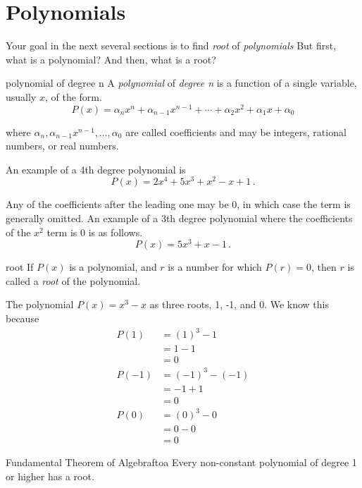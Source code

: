 \section{Polynomials}
\label{sec.general}

Your goal in the next several sections is to find \emph{root} of \emph{polynomials}
But first, what is a polynomial? And then, what is a root?

\begin{definition}{polynomial of degree n}{}
  A \emph{polynomial} of \emph{degree n} is a function of a single variable, usually $x$,
  of the form.
  \[P(x) = \alpha_n x^n + \alpha_{n-1} x^{n-1} + \cdots + \alpha_2 x^2 + \alpha_1 x + \alpha_0 \]

  where $\alpha_n,  \alpha_{n-1} x^{n-1}, \ldots, \alpha_0$ are called coefficients and may be integers, rational numbers, or real numbers.
\end{definition}

An example of a 4th degree polynomial is
\[P(x) = 2 x^4 + 5 x^3 + x^2 - x + 1\,.\]


Any of the coefficients after the leading one may be 0, in which case the term is generally omitted.
An example of a 3th degree polynomial where the coefficients of the $x^2$ term is 0 is as follows.
\[P(x) = 5 x^3 + x - 1\,.\]

\begin{definition}{root}{}
  If $P(x)$ is a polynomial, and $r$ is a number for which $P(r)=0$, then $r$ is called a \emph{root}
  of the polynomial.
\end{definition}

The polynomial $P(x) = x^3 - x$ as three roots, 1, -1, and 0.  We know this because
\begin{align*}
  P(1) &= (1)^3 - 1 \\
  &= 1 - 1 \\
  &= 0\\[3pt]
  P(-1) &= (-1)^3 - (-1) \\
  &= -1 + 1 \\
  &= 0\\[3pt]
  P(0) &= (0)^3 - 0\\
  &= 0 - 0 \\
  &= 0  
\end{align*}

\begin{theorem}{Fundamental Theorem of Algebra}{ftoa}
  Every non-constant polynomial of degree 1 or higher has a root.
\end{theorem}

